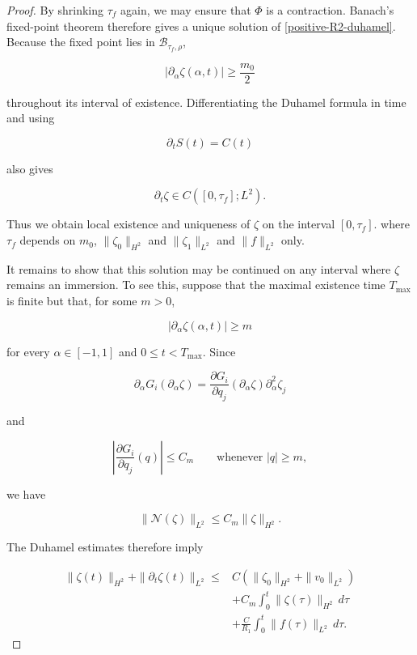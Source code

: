 \documentclass{article}[12pt]
\theoremstyle{Theorem}
\begin{document}
\begin{proof}
By shrinking \(\tau_f\) again, we may ensure that \(\Phi\) is a contraction. Banach's fixed-point theorem therefore gives a unique solution of \eqref{positive-R2-duhamel}. Because the fixed point lies in \(\mathcal B_{\tau_f,\rho}\),

$$
    |\partial_\alpha\zeta(\alpha,t)|
    \geq\frac{m_0}{2}
$$

throughout its interval of existence. Differentiating the Duhamel formula in time and using

$$
    \partial_tS(t)=C(t)
$$

also gives

$$
    \partial_t\zeta\in C([0,\tau_f];L^2).
$$

Thus we obtain local existence and uniqueness of $\zeta$ on the interval $[0,\tau_f]$. where $\tau_f$ depends on $m_0$, $\|\zeta_0\|_{H^2}$ and $\|\zeta_1\|_{L^2}$ and $\|f\|_{L^2}$ only.
\newline 

It remains to show that this solution may be continued on any interval where $\zeta$ remains an immersion. To see this, suppose that the maximal existence time \(T_{\max}\) is finite but that, for some \(m>0\),

$$
    |\partial_\alpha\zeta(\alpha,t)|\geq m
$$

for every \(\alpha\in[-1,1]\) and \(0\leq t<T_{\max}\). Since

$$
    \partial_\alpha G_i(\partial_\alpha\zeta)
    =
    \frac{\partial G_i}{\partial q_j}
        (\partial_\alpha\zeta)
    \partial_\alpha^2\zeta_j
$$

and

$$
    \left|
        \frac{\partial G_i}{\partial q_j}(q)
    \right|
    \leq C_m
    \qquad\text{whenever }|q|\geq m,
$$

we have

$$
    \|\mathcal N(\zeta)\|_{L^2}
    \leq C_m\|\zeta\|_{H^2}.
$$

The Duhamel estimates therefore imply

$$
\begin{aligned}
    \|\zeta(t)\|_{H^2}
    +\|\partial_t\zeta(t)\|_{L^2}
    \leq{}&
    C\left(
        \|\zeta_0\|_{H^2}
        +\|v_0\|_{L^2}
    \right)\\
    &+
    C_m\int_0^t
    \|\zeta(\tau)\|_{H^2}\,d\tau\\
    &+
    \frac{C}{R_1}
    \int_0^t
    \|f(\tau)\|_{L^2}\,d\tau.
\end{aligned}
$$


\end{proof}
\end{document}
